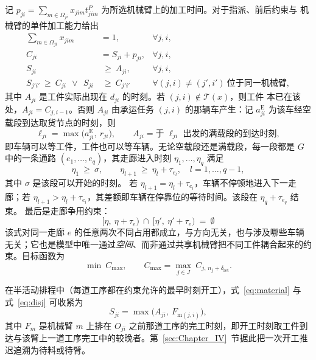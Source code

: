 \documentclass[manuscript,screen,review]{acmart}
\begin{document}
记 $p_{ji}=\sum_{m\in\Omega_{ji}}x_{jim}t^P_{jim}$ 为所选机械臂上的加工时间。对于指派、前后约束与
机械臂的单件加工能力给出
\begin{align}
\sum_{m\in\Omega_{ji}} x_{jim} &= 1, & \forall j,i,
\label{eq:assign}\\
C_{ji} &= S_{ji}+p_{ji}, & \forall j,i,
\label{eq:dur}\\
S_{ji} &\ \ge\ A_{ji}, & \forall j,i,
\label{eq:material}\\
S_{j'i'}\ \ge\ C_{ji}\ \ \vee\ \ S_{ji} &\ \ge\ C_{j'i'}
& \forall (j,i)\neq(j',i')\ \text{位于同一机械臂},
\label{eq:disj}
\end{align}
其中 $A_{ji}$ 是工件实际出现在 $d_{ji}$ 的时刻。若 $(j,i)\notin\mathcal{T}(x)$，则工件
本已在该处，$A_{ji}=C_{j,i-1}$。否则 $A_{ji}$ 由承运任务 $(j,i)$ 的那辆车产生：记
$a^{\mathrm{E}}_{ji}$ 为该车经空载段到达取货节点的时刻，则
\begin{equation}
\label{eq:load}
\ell_{ji}=\max\bigl(a^{\mathrm{E}}_{ji},\ r_{ji}\bigr),
\qquad
A_{ji}=\text{于 } \ell_{ji} \text{ 出发的满载段的到达时刻},
\end{equation}
即车辆可以等工件，工件也可以等车辆。无论空载段还是满载段，每一段都是 $G$ 中的一条通路
$(e_1,\dots,e_q)$，其走廊进入时刻 $\eta_1,\dots,\eta_q$ 满足
\begin{equation}
\label{eq:walk}
\eta_1 \ \ge\ \sigma, \qquad
\eta_{l+1}\ \ge\ \eta_l+\tau_{e_l}, \quad l=1,\dots,q-1,
\end{equation}
其中 $\sigma$ 是该段可以开始的时刻。
若 $\eta_{l+1}=\eta_l+\tau_{e_l}$，车辆不停顿地进入下一走廊；若 $\eta_{l+1}>\eta_l+\tau_{e_l}$，其差额即车辆在停靠位的等待时间。该段在 $\eta_q+\tau_{e_q}$ 结束。
最后是走廊争用约束：
\begin{equation}
\label{eq:excl}
\bigl[\eta,\ \eta+\tau_e\bigr)\ \cap\
\bigl[\eta',\ \eta'+\tau_e\bigr)\ =\ \emptyset
\end{equation}
该式对同一走廊 $e$ 的任意两次不同占用都成立，与方向无关，也与涉及哪些车辆无关；它也是模型中唯一通过\emph{空间}、而非通过共享机械臂把不同工件耦合起来的约束。目标函数为
\begin{equation}
\label{eq:obj}
\min\ C_{\max},\qquad
C_{\max}=\max_{j\in J}\ C_{j,\,n_j+\delta_{\mathrm{ret}}} .
\end{equation}

在半活动排程中（每道工序都在约束允许的最早时刻开工），式~\eqref{eq:material} 与式~\eqref{eq:disj} 可收紧为
\begin{equation}
\label{eq:bind}
S_{ji}=\max\bigl(A_{ji},\ F_{\mathrm{m}(j,i)}\bigr),
\end{equation}
其中 $F_m$ 是机械臂 $m$ 上排在 $O_{ji}$ 之前那道工序的完工时刻，即开工时刻取工件到达与该臂上一道工序完工中的较晚者。第~\ref{sec:Chapter_IV}~节据此把一次开工推迟追溯为待料或待臂。
\end{document}
